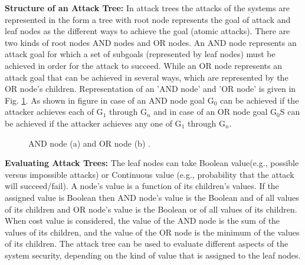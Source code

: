 \documentclass[pdftex,english,oribibl]{llncs}
\begin{document}
\textbf{Structure of an Attack Tree:} In attack trees the attacks of the systems are represented in the form a tree with root node represents the goal of attack and leaf nodes as the different ways to achieve the goal (atomic attacks). There are two kinds of root nodes AND nodes and OR nodes. An AND node represents an attack goal for which a set of subgoals (represented by leaf nodes) must be achieved in order for the attack to succeed. While an OR node represents an attack goal that can be achieved in several ways, which are represented by the OR node's children. Representation of an 'AND node' and 'OR node' is given in Fig. \ref{fig:and_or_node}. As shown in figure in case of an AND node goal G$_0$ can be achieved if the attacker achieves each of G$_1$ through G$_n$ and in case of an OR node goal G$_0$S can be achieved if the attacker achieves any one of G$_1$ through G$_n$. 

\begin{figure}[h]
	\centering
	\caption{AND node (a) and OR node (b) \cite{1335467_Nicol}.}
	\label{fig:and_or_node}
\end{figure}

\textbf{Evaluating Attack Trees:} The leaf nodes can take Boolean value(e.g., possible versus impossible attacks) or Continuous value (e.g., probability that the attack will succeed/fail). A node's value is a function of its children's values. If the assigned value is Boolean then AND node's value is the Boolean and of all values of its children and OR node's value is the Boolean or of all values of its children. When cost value is considered, the value of the AND node is the sum of the values of its children, and the value of the OR node is the minimum of the values of its children. The attack tree can be used to evaluate different aspects of the system security, depending on the kind of value that is assigned to the leaf nodes.
\end{document}
